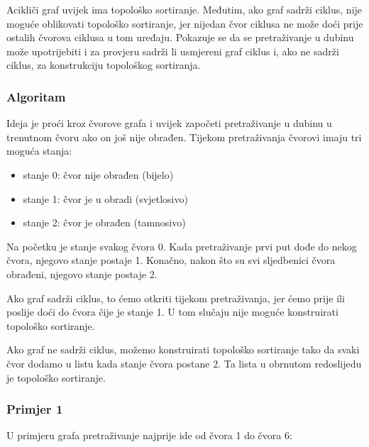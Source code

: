 Acikliči graf uvijek ima topološko sortiranje.
Međutim, ako graf sadrži ciklus,
nije moguće oblikovati topološko sortiranje,
jer nijedan čvor ciklusa ne može doći
prije ostalih čvorova ciklusa u tom uređaju.
Pokazuje se da se pretraživanje u dubinu može upotrijebiti
i za provjeru sadrži li usmjereni graf ciklus
i, ako ne sadrži ciklus, za konstrukciju topološkog sortiranja.

\subsubsection{Algoritam}

Ideja je proći kroz čvorove grafa
i uvijek započeti pretraživanje u dubinu u trenutnom čvoru
ako on još nije obrađen.
Tijekom pretraživanja čvorovi imaju tri moguća stanja:

\begin{itemize}
\item stanje 0: čvor nije obrađen (bijelo)
\item stanje 1: čvor je u obradi (svjetlosivo)
\item stanje 2: čvor je obrađen (tamnosivo)
\end{itemize}

Na početku je stanje svakog čvora 0.
Kada pretraživanje prvi put dođe do nekog čvora,
njegovo stanje postaje 1.
Konačno, nakon što su svi sljedbenici čvora
obrađeni, njegovo stanje postaje 2.

Ako graf sadrži ciklus, to ćemo otkriti
tijekom pretraživanja, jer ćemo prije ili poslije
doći do čvora čije je stanje 1.
U tom slučaju nije moguće konstruirati topološko sortiranje.

Ako graf ne sadrži ciklus, možemo konstruirati
topološko sortiranje tako da
svaki čvor dodamo u listu kada stanje čvora postane 2.
Ta lista u obrnutom redoslijedu je topološko sortiranje.

\subsubsection{Primjer 1}

U primjeru grafa pretraživanje najprije ide
od čvora 1 do čvora 6:

\begin{center}
\end{center}

